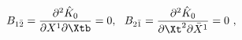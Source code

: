 \begin{equation}
B_{1\bar{2}} = {\partial^2\hat{K}_0\over \partial X^1\partial
  \Xtb} = 0,~~
B_{2\bar{1}} = {\partial^2\hat{K}_0\over \partial \Xt^2\partial
  \bar{X}^1} = 0 \ ,
\end{equation}

